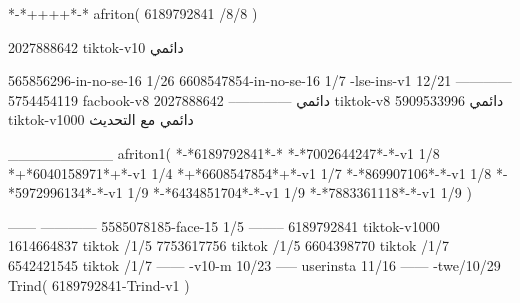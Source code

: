 *-*++++*-*
afriton(
6189792841 /8/8
)

2027888642 tiktok-v10
دائمي

565856296-in-no-se-16 1/26
6608547854-in-no-se-16 1/7
-lse-ins-v1 12/21
------------
5754454119 facbook-v8
دائمي
--------------
2027888642 tiktok-v8
دائمي
5909533996 tiktok-v1000
دائمي مع التحديث

__________
afriton1(
*-*6189792841*-*
*-*7002644247*-*-v1 1/8
*+*6040158971*+*-v1 1/4
*+*6608547854*+*-v1 1/7
*-*869907106*-*-v1 1/8
*-*5972996134*-*-v1 1/9
*-*6434851704*-*-v1 1/9
*-*7883361118*-*-v1 1/9
)

------
------------
5585078185-face-15 1/5
--------
6189792841 tiktok-v1000
1614664837 tiktok /1/5
7753617756 tiktok /1/5
6604398770 tiktok /1/7
6542421545 tiktok /1/7
------
-v10-m 10/23
-----
userinsta 11/16
------
-twe/10/29
Trind(
6189792841-Trind-v1 
)
